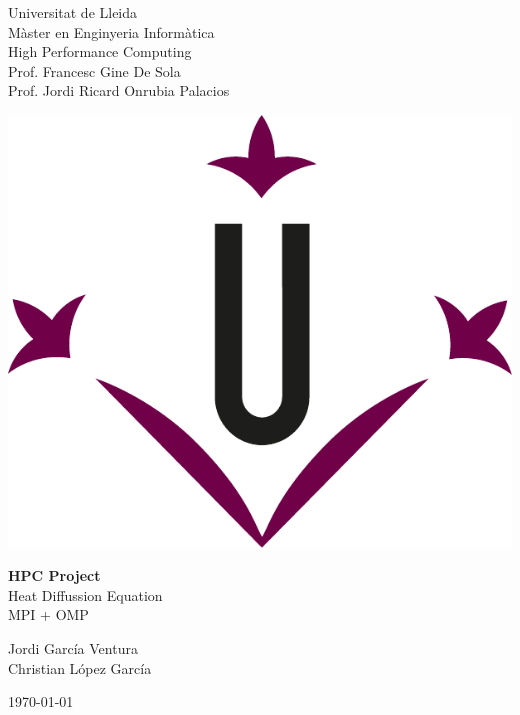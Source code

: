 \documentclass[../main.tex]{subfiles}
\begin{document}
\begin{titlepage}
    \begin{minipage}[c]{0.4\linewidth}
    Universitat de Lleida \\
    Màster en Enginyeria Informàtica \\
    High Performance Computing \\
    Prof. Francesc Gine De Sola \\
    Prof. Jordi Ricard Onrubia Palacios
    \end{minipage}
    \hfill
    \begin{minipage}[c]{0.5\linewidth}
    \hfill
    \includegraphics[width=0.4\linewidth]{media/figures//udl_logo.pdf}
    \end{minipage}
        
    \vspace{5cm}

     \begin{center}
        \Huge
        \textbf{HPC Project} \\ Heat Diffussion Equation \\ MPI + OMP
    \end{center}        
            
    \vspace{5cm}
        
    \begin{flushright}
        \large
        Jordi García Ventura \\
        Christian López García
    \end{flushright}
        
    \vfill
        
    \begin{center}
        \today
    \end{center}
\end{titlepage}
\end{document}
